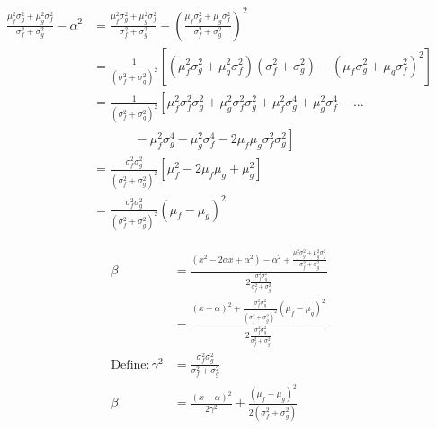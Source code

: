 \documentclass[/home/jesse/Analysis/FemtoAnalysis/AnalysisNotes/AnalysisNoteJBuxton.tex]{subfiles}
\begin{document}
\vspace{10mm}


\begin{equation}
\begin{aligned}
\frac{\mu_{f}^{2}\sigma_{g}^{2} + \mu_{g}^{2}\sigma_{f}^{2}}{\sigma_{f}^{2} + \sigma_{g}^{2}} - \alpha^{2} &= \frac{\mu_{f}^{2}\sigma_{g}^{2} + \mu_{g}^{2}\sigma_{f}^{2}}{\sigma_{f}^{2} + \sigma_{g}^{2}}  - \left( \frac{\mu_{f}\sigma_{g}^{2} + \mu_{g}\sigma_{f}^{2}}{\sigma_{f}^{2} + \sigma_{g}^{2}} \right)^{2} \\
&= \frac{1}{(\sigma_{f}^{2} + \sigma_{g}^{2})^{2}} \left[ (\mu_{f}^{2}\sigma_{g}^{2} + \mu_{g}^{2}\sigma_{f}^{2})(\sigma_{f}^{2} + \sigma_{g}^{2}) - (\mu_{f}\sigma_{g}^{2} + \mu_{g}\sigma_{f}^{2})^{2} \right] \\
&= \frac{1}{(\sigma_{f}^{2} + \sigma_{g}^{2})^{2}}\left[ \mu_{f}^{2}\sigma_{f}^{2}\sigma_{g}^{2} + \mu_{g}^{2}\sigma_{f}^{2}\sigma_{g}^{2} + \mu_{f}^{2}\sigma_{g}^{4} + \mu_{g}^{2}\sigma_{f}^{4} - ...\right. \\
&~~~~~~~~~~~~~~~ - \left. \mu_{f}^{2}\sigma_{g}^{4} - \mu_{g}^{2}\sigma_{f}^{4} - 2\mu_{f}\mu_{g}\sigma_{f}^{2}\sigma_{g}^{2} \right] \\
&= \frac{\sigma_{f}^{2}\sigma_{g}^{2}}{(\sigma_{f}^{2} + \sigma_{g}^{2})^{2}}\left[ \mu_{f}^{2} - 2\mu_{f}\mu_{g} + \mu_{g}^{2} \right] \\
&= \frac{\sigma_{f}^{2}\sigma_{g}^{2}}{(\sigma_{f}^{2} + \sigma_{g}^{2})^{2}}(\mu_{f}-\mu_{g})^{2}
\end{aligned}
\label{eqn:ProdGauss3}
\end{equation}

\vspace{10mm}

\begin{equation}
\begin{aligned}
\beta &= \frac{(x^{2} - 2\alpha x + \alpha^{2}) - \alpha^{2} + \frac{\mu_{f}^{2}\sigma_{g}^{2} + \mu_{g}^{2}\sigma_{f}^{2}}{\sigma_{f}^{2} + \sigma_{g}^{2}}}{2 \frac{\sigma_{f}^{2}\sigma_{g}^{2}}{\sigma_{f}^{2} + \sigma_{g}^{2}}} \\
&= \frac{(x-\alpha)^{2} + \frac{\sigma_{f}^{2}\sigma_{g}^{2}}{(\sigma_{f}^{2} + \sigma_{g}^{2})^{2}}(\mu_{f}-\mu_{g})^{2}}{2\frac{\sigma_{f}^{2}\sigma_{g}^{2}}{\sigma_{f}^{2}+\sigma_{g}^{2}}} \\
\mathrm{Define} : \gamma^{2} &= \frac{\sigma_{f}^{2}\sigma_{g}^{2}}{\sigma_{f}^{2}+\sigma_{g}^{2}} \\
\beta &= \frac{(x-\alpha)^{2}}{2\gamma^{2}} + \frac{(\mu_{f}-\mu_{g})^{2}}{2(\sigma_{f}^{2}+\sigma_{g}^{2})}
\end{aligned}
\label{eqn:ProdGauss4}
\end{equation}
\end{document}
